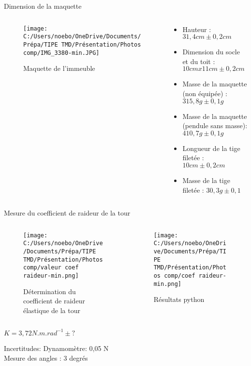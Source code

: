 \documentclass{beamer}
\begin{document}
\begin{frame}{Dimension de la maquette}
			\begin{columns}
		\begin{column}{0.5\textwidth}
			\begin{figure}
				\texttt{[image: C:/Users/noebo/OneDrive/Documents/Prépa/TIPE TMD/Présentation/Photos comp/IMG\_3380-min.JPG]}
				\caption{Maquette de l'immeuble}
			\end{figure}
		\end{column}
		\begin{column}{0.5\textwidth}
			\begin{itemize}
				\item  Hauteur : $31,4 cm \pm 0,2 cm$
				\item  Dimension du socle et du toit : $10 cm x 11 cm \pm 0,2 cm$
				\item Masse de la maquette (non équipée) :$ 315,8 g \pm 0,1g $
				\item Masse de la maquette (pendule sans masse): $410,7 g \pm 0,1 g$
				\item Longueur de la tige filetée : $10cm \pm 0,2cm$
				\item Masse de la tige filetée : $ 30,3 g \pm 0,1$
			\end{itemize}
			
		\end{column}
	\end{columns}
\end{frame}


\begin{frame}{Mesure du coefficient de raideur de la tour}
				\begin{columns}
		\begin{column}{0.5\textwidth}
			\begin{figure}
				\texttt{[image: C:/Users/noebo/OneDrive/Documents/Prépa/TIPE TMD/Présentation/Photos comp/valeur coef raideur-min.png]}
				\caption{Détermination du coefficient de raideur élastique de la tour}
			\end{figure}
		\end{column}
		\begin{column}{0.5\textwidth}
				\begin{figure}
				\texttt{[image: C:/Users/noebo/OneDrive/Documents/Prépa/TIPE TMD/Présentation/Photos comp/coef raideur-min.png]}
				\caption{Résultats python}
			\end{figure}
		\end{column}
	\end{columns}
  $K=3,72 N.m.rad^{-1}\pm ?$
  
  
  Incertitudes: Dynamomètre: 0,05 N \\
  Mesure des angles : 3 degrés 
\end{frame}
\end{document}
